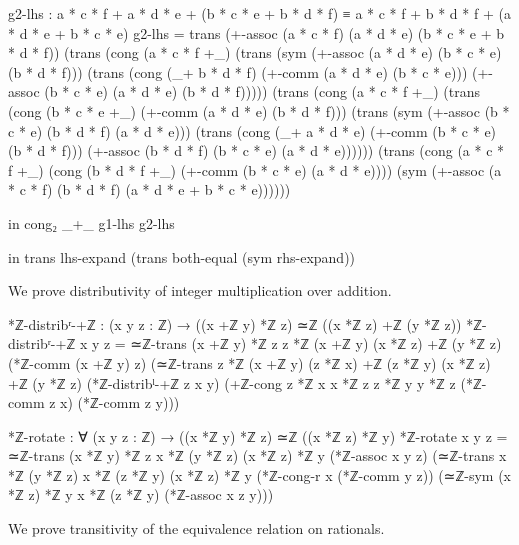 \documentclass[11pt,a4paper]{book}
\begin{document}
\begin{code}
            g2-lhs : a * c * f + a * d * e + (b * c * e + b * d * f)
                   ≡ a * c * f + b * d * f + (a * d * e + b * c * e)
            g2-lhs = trans (+-assoc (a * c * f) (a * d * e) (b * c * e + b * d * f))
                     (trans (cong (a * c * f +_) (trans (sym (+-assoc (a * d * e) (b * c * e) (b * d * f)))
                            (trans (cong (_+ b * d * f) (+-comm (a * d * e) (b * c * e)))
                            (+-assoc (b * c * e) (a * d * e) (b * d * f)))))
                     (trans (cong (a * c * f +_) (trans (cong (b * c * e +_) (+-comm (a * d * e) (b * d * f)))
                            (trans (sym (+-assoc (b * c * e) (b * d * f) (a * d * e)))
                            (trans (cong (_+ a * d * e) (+-comm (b * c * e) (b * d * f)))
                            (+-assoc (b * d * f) (b * c * e) (a * d * e))))))
                     (trans (cong (a * c * f +_) (cong (b * d * f +_) (+-comm (b * c * e) (a * d * e))))
                     (sym (+-assoc (a * c * f) (b * d * f) (a * d * e + b * c * e))))))
                     
          in cong₂ _+_ g1-lhs g2-lhs
          
      in trans lhs-expand (trans both-equal (sym rhs-expand))
\end{code}

We prove distributivity of integer multiplication over addition.

\begin{code}
*ℤ-distribʳ-+ℤ : (x y z : ℤ) → ((x +ℤ y) *ℤ z) ≃ℤ ((x *ℤ z) +ℤ (y *ℤ z))
*ℤ-distribʳ-+ℤ x y z = 
  ≃ℤ-trans {(x +ℤ y) *ℤ z} {z *ℤ (x +ℤ y)} {(x *ℤ z) +ℤ (y *ℤ z)}
    (*ℤ-comm (x +ℤ y) z)
    (≃ℤ-trans {z *ℤ (x +ℤ y)} {(z *ℤ x) +ℤ (z *ℤ y)} {(x *ℤ z) +ℤ (y *ℤ z)}
      (*ℤ-distribˡ-+ℤ z x y)
      (+ℤ-cong {z *ℤ x} {x *ℤ z} {z *ℤ y} {y *ℤ z} (*ℤ-comm z x) (*ℤ-comm z y)))

*ℤ-rotate : ∀ (x y z : ℤ) → ((x *ℤ y) *ℤ z) ≃ℤ ((x *ℤ z) *ℤ y)
*ℤ-rotate x y z = 
  ≃ℤ-trans {(x *ℤ y) *ℤ z} {x *ℤ (y *ℤ z)} {(x *ℤ z) *ℤ y}
    (*ℤ-assoc x y z)
    (≃ℤ-trans {x *ℤ (y *ℤ z)} {x *ℤ (z *ℤ y)} {(x *ℤ z) *ℤ y}
      (*ℤ-cong-r x (*ℤ-comm y z))
      (≃ℤ-sym {(x *ℤ z) *ℤ y} {x *ℤ (z *ℤ y)} (*ℤ-assoc x z y)))
\end{code}

We prove transitivity of the equivalence relation on rationals.
\end{document}
